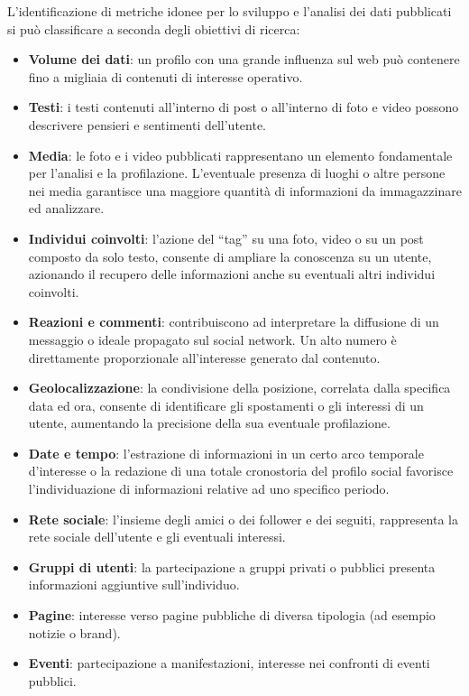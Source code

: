 L'identificazione di metriche idonee per lo sviluppo e l'analisi dei dati pubblicati si pu\`o classificare a seconda degli obiettivi di ricerca: 
\begin{itemize}
    \item \textbf{Volume dei dati}: un profilo con una grande influenza sul web pu\`o contenere fino a migliaia di contenuti di interesse operativo.
    \item \textbf{Testi}: i testi contenuti all'interno di post o all'interno di foto e video possono descrivere pensieri e sentimenti dell'utente.
    \item \textbf{Media}: le foto e i video pubblicati rappresentano un elemento fondamentale per l'analisi e la profilazione. L'eventuale presenza di luoghi o altre persone nei media garantisce una maggiore quantit\`a di informazioni da immagazzinare ed analizzare.
    \item \textbf{Individui coinvolti}: l'azione del ``tag'' su una foto, video o su un post composto da solo testo, consente di ampliare la conoscenza su un utente, azionando il recupero delle informazioni anche su eventuali altri individui coinvolti.
    \item \textbf{Reazioni e commenti}: contribuiscono ad interpretare la diffusione di un messaggio o ideale propagato sul social network. Un alto numero \`e direttamente proporzionale all'interesse generato dal contenuto.
    \item \textbf{Geolocalizzazione}: la condivisione della posizione, correlata dalla specifica data ed ora, consente di identificare gli spostamenti o gli interessi di un utente, aumentando la precisione della sua eventuale profilazione.
    \item \textbf{Date e tempo}: l'estrazione di informazioni in un certo arco temporale d'interesse o la redazione di una totale cronostoria del profilo social favorisce l'individuazione di informazioni relative ad uno specifico periodo.
    \item \textbf{Rete sociale}: l'insieme degli amici o dei follower e dei seguiti, rappresenta la rete sociale dell'utente e gli eventuali interessi.
    \item \textbf{Gruppi di utenti}: la partecipazione a gruppi privati o pubblici presenta informazioni aggiuntive sull'individuo.
    \item \textbf{Pagine}: interesse verso pagine pubbliche di diversa tipologia (ad esempio notizie o brand).
    \item \textbf{Eventi}: partecipazione a manifestazioni, interesse nei confronti di eventi pubblici.
    
\end{itemize}
